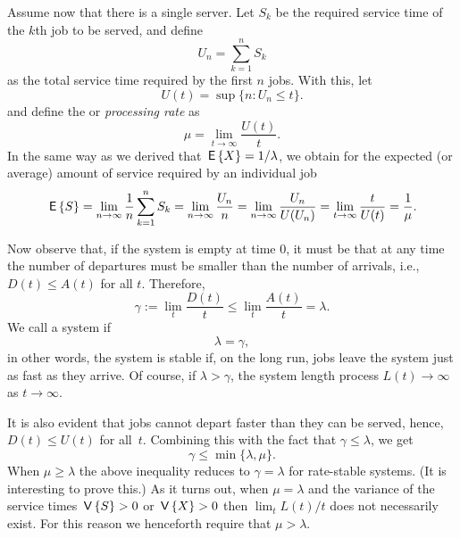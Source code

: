 Assume now that there is a single server. Let $S_k$ be the required
service time of the $k$th job to be served, and define
\begin{equation*}
U_n = \sum_{k=1}^n S_k
\end{equation*}
as the total service time required by the first $n$ jobs. With this,
let 
\begin{equation*}
  U(t) = \sup\{n: U_n \leq t\}.
\end{equation*}
and  define the  or \emph{processing rate} as
\begin{equation*}
  \mu = \lim_{t\to\infty} \frac{U(t)}t.
\end{equation*}
In the same way as we derived that $\,\mathsf{E}\left\{X\right\}= 1/\lambda$, we obtain for
the expected (or average) amount of service required by an individual
job
\begin{equation*}
  \,\mathsf{E}\left\{S\right\} = \lim_{n\to\infty} \frac 1 n \sum_{k=1}^n S_k = \lim_{n\to\infty} \frac{U_n}{n} = \lim_{n\to\infty} \frac{U_n}{U(U_n)} = \lim_{t\to\infty} \frac t{U(t)} = \frac 1 \mu.
\end{equation*}

Now observe that, if the system is empty at time $0$, it must be that
at any time the number of departures must be smaller than the number
of arrivals, i.e., $D(t) \leq A(t)$ for all $t$. Therefore,
\begin{equation}\label{eq:26}
\gamma :=   \lim_t \frac{D(t)}t \leq \lim_t \frac{A(t)}t = \lambda.
\end{equation}
We call a system  if
\begin{equation*}
  \lambda = \gamma,
\end{equation*}
in other words, the system is stable if, on the long run, jobs leave
the system just as fast as they arrive. Of course, if
$\lambda > \gamma$, the system length process $L(t) \to \infty$ as
$t\to \infty$.

It is also evident that jobs cannot depart faster than they can be
served, hence, $D(t) \leq U(t)$ for all~$t$. Combining this with the
fact that $\gamma \leq \lambda$, we get
\begin{equation*}
  \gamma \leq \min\{\lambda, \mu\}.
\end{equation*}
When $\mu \geq \lambda$ the above inequality reduces to
$\gamma = \lambda$ for rate-stable systems. (It is interesting to
prove this.) As it turns out, when $\mu = \lambda$ and the variance of
the service times $\,\mathsf{V}\left\{S\right\} > 0$ or $\,\mathsf{V}\left\{X\right\} >0$ then $\lim_t L(t)/t$
does not necessarily exist. For this reason we henceforth require that
$\mu > \lambda$.



